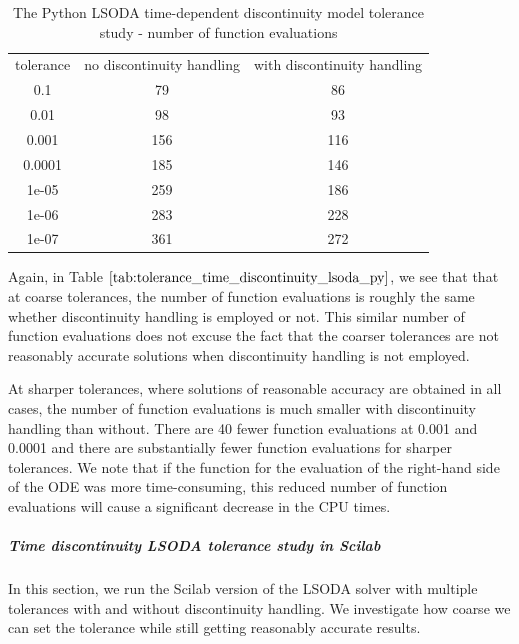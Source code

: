 \begin{table}[H]
\caption {The Python LSODA time-dependent discontinuity model tolerance study - number of function evaluations} \label{tab:tolerance_time_discontinuity_lsoda_py} 
\begin{center}
\begin{tabular}{ c c c }
tolerance & no discontinuity handling & with discontinuity handling \\ 
0.1 & 79 & 86 \\
0.01 & 98 & 93 \\
0.001 & 156 & 116 \\
0.0001 & 185 & 146 \\
1e-05 & 259 & 186 \\
1e-06 & 283 & 228 \\
1e-07 & 361 & 272 \\
\end{tabular}
\end{center}
\end{table}
Again, in Table $\ref{tab:tolerance_time_discontinuity_lsoda_py}$, we see that that at coarse tolerances, the number of function evaluations is roughly the same whether discontinuity handling is employed or not. This similar number of function evaluations does not excuse the fact that the coarser tolerances are not reasonably accurate solutions when discontinuity handling is not employed.

At sharper tolerances, where solutions of reasonable accuracy are obtained in all cases, the number of function evaluations is much smaller with discontinuity handling than without. There are 40 fewer function evaluations at 0.001 and 0.0001 and there are substantially fewer function evaluations for sharper tolerances. We note that if the function for the evaluation of the right-hand side of the ODE was more time-consuming, this reduced number of function evaluations will cause a significant decrease in the CPU times.

\subparagraph{Time discontinuity LSODA tolerance study in Scilab}
In this section, we run the Scilab version of the LSODA solver with multiple tolerances with and without discontinuity handling. We investigate how coarse we can set the tolerance while still getting reasonably accurate results.

